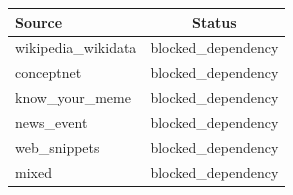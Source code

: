 \begin{tabular}{lc}
\toprule
Source & Status \\ 
\midrule
wikipedia\_wikidata & blocked\_dependency \\
conceptnet & blocked\_dependency \\
know\_your\_meme & blocked\_dependency \\
news\_event & blocked\_dependency \\
web\_snippets & blocked\_dependency \\
mixed & blocked\_dependency \\
\bottomrule
\end{tabular}
